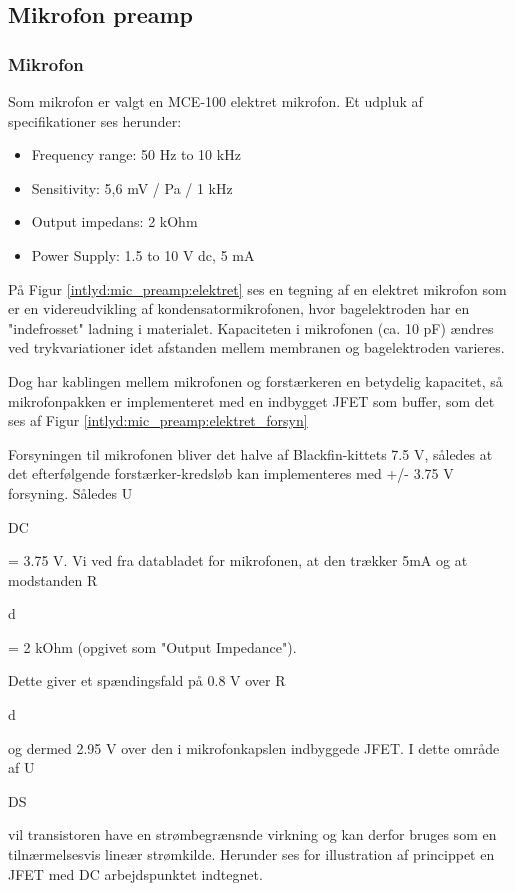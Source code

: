 
\subsection*{Mikrofon preamp}

\subsubsection{Mikrofon} 
Som mikrofon er valgt en MCE-100 elektret mikrofon. Et udpluk af specifikationer ses herunder:
\begin{itemize}
	\item Frequency range: 50 Hz to 10 kHz
	\item Sensitivity: 5,6 mV / Pa / 1 kHz
	\item Output impedans: 2 kOhm
	\item Power Supply: 1.5 to 10 V dc, 5 mA
\end{itemize}
 
På Figur \ref{intlyd:mic_preamp:elektret} ses en tegning af en elektret mikrofon som er en videreudvikling af kondensatormikrofonen, hvor bagelektroden har en "indefrosset" ladning i materialet. Kapaciteten i mikrofonen (ca. 10 pF) ændres ved trykvariationer idet afstanden mellem membranen og bagelektroden varieres. 


Dog har kablingen mellem mikrofonen og forstærkeren en betydelig kapacitet, så mikrofonpakken er implementeret med en indbygget JFET som buffer, som det ses af Figur \ref{intlyd:mic_preamp:elektret_forsyn}

Forsyningen til mikrofonen bliver det halve af Blackfin-kittets 7.5 V, således at det efterfølgende forstærker-kredsløb kan implementeres med +/- 3.75 V forsyning. Således U\begin{tiny}DC\end{tiny} = 3.75 V. 
Vi ved fra databladet for mikrofonen, at den trækker 5mA og at modstanden R\begin{tiny}d\end{tiny} = 2 kOhm (opgivet som "Output Impedance").

Dette giver et spændingsfald på 0.8 V over R\begin{tiny}d\end{tiny} og dermed 2.95 V over den i mikrofonkapslen indbyggede JFET. I dette område af U\begin{tiny}DS\end{tiny} vil transistoren have en strømbegrænsnde virkning og kan derfor bruges som en tilnærmelsesvis lineær strømkilde. Herunder ses for illustration af princippet en JFET med DC arbejdspunktet indtegnet.

